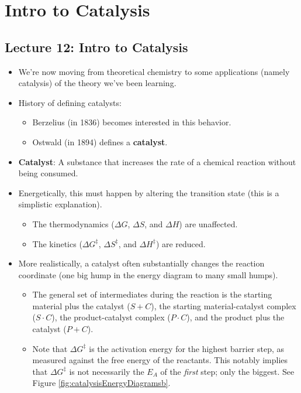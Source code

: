 \documentclass[../notes.tex]{subfiles}
\begin{document}
\chapter{Intro to Catalysis}
\section{Lecture 12: Intro to Catalysis}
\begin{itemize}
    \item {}We're now moving from theoretical chemistry to some applications (namely catalysis) of the theory we've been learning.
    \item History of defining catalysts:
    \begin{itemize}
        \item Berzelius (in 1836) becomes interested in this behavior.
        \item Ostwald (in 1894) defines a \textbf{catalyst}.
    \end{itemize}
    \item \textbf{Catalyst}: A substance that increases the rate of a chemical reaction without being consumed.
    \item Energetically, this must happen by altering the transition state (this is a simplistic explanation).
    \begin{itemize}
        \item The thermodynamics ($\Delta G$, $\Delta S$, and $\Delta H$) are unaffected.
        \item The kinetics ($\Delta G^\ddagger$, $\Delta S^\ddagger$, and $\Delta H^\ddagger$) are reduced.
    \end{itemize}
    \item More realistically, a catalyst often substantially changes the reaction coordinate (one big hump in the energy diagram to many small humps).
    \begin{itemize}
        \item The general set of intermediates during the reaction is the starting material plus the catalyst ($S+C$), the starting material-catalyst complex ($S\cdot C$), the product-catalyst complex ($P\cdot C$), and the product plus the catalyst ($P+C$).
        \item Note that $\Delta G^\ddagger$ is the activation energy for the highest barrier step, as measured against the free energy of the reactants. This notably implies that $\Delta G^\ddagger$ is not necessarily the $E_A$ of the \emph{first} step; only the biggest. See Figure \ref{fig:catalysisEnergyDiagramsb}.

\end{itemize}
\end{itemize}
\end{document}

